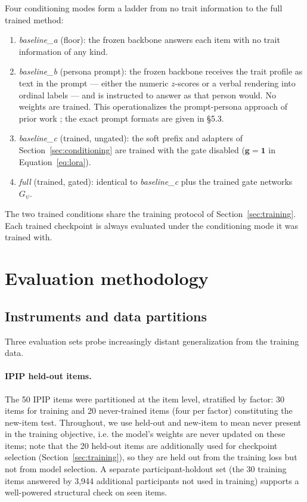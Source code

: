 \documentclass[11pt]{article}
\begin{document}
Four conditioning modes form a ladder from no trait information to the full trained method:

\begin{enumerate}
\item \textit{baseline\_a} (floor): the frozen backbone answers each item with no trait information of any kind.
\item \textit{baseline\_b} (persona prompt): the frozen backbone receives the trait profile as text in the prompt --- either the numeric $z$-scores or a verbal rendering into ordinal labels --- and is instructed to answer as that person would. No weights are trained. This operationalizes the prompt-persona approach of prior work \citep{argyle2023,serapiogarcia2023,jiang2023}; the exact prompt formats are given in \S{}5.3.
\item \textit{baseline\_c} (trained, ungated): the soft prefix and adapters of Section~\ref{sec:conditioning} are trained with the gate disabled ($\mathbf{g} = \mathbf{1}$ in Equation~\ref{eq:lora}).
\item \textit{full} (trained, gated): identical to \textit{baseline\_c} plus the trained gate networks $G_\psi$.
\end{enumerate}

The two trained conditions share the training protocol of Section~\ref{sec:training}. Each trained checkpoint is always evaluated under the conditioning mode it was trained with.


\section{Evaluation methodology}
\label{sec:evaluation}

\subsection{Instruments and data partitions}
\label{sec:instruments}

Three evaluation sets probe increasingly distant generalization from the training data.


\paragraph{IPIP held-out items.} The 50 IPIP items were partitioned at the item level, stratified by factor: 30 items for training and 20 never-trained items (four per factor) constituting the new-item test. Throughout, we use held-out and new-item to mean never present in the training objective, i.e. the model's weights are never updated on these items; note that the 20 held-out items are additionally used for checkpoint selection (Section~\ref{sec:training}), so they are held out from the training loss but not from model selection. A separate participant-holdout set (the 30 training items answered by 3,944 additional participants not used in training) supports a well-powered structural check on seen items.
\end{document}

